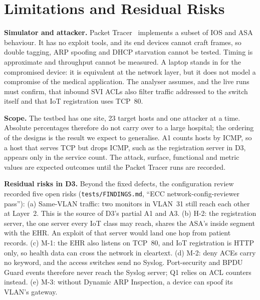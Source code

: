 \section{Limitations and Residual Risks}
\label{sec:limits}

\textbf{Simulator and attacker.} Packet Tracer~\cite{packettracer} implements a subset of IOS and ASA behaviour. It has no exploit tools, and its end devices cannot craft frames, so double tagging, ARP spoofing and DHCP starvation cannot be tested. Timing is approximate and throughput cannot be measured. A laptop stands in for the compromised device: it is equivalent at the network layer, but it does not model a compromise of the medical application. The analyser assumes, and the live runs must confirm, that inbound SVI ACLs also filter traffic addressed to the switch itself and that IoT registration uses TCP~80.

\textbf{Scope.} The testbed has one site, 23 target hosts and one attacker at a time. Absolute percentages therefore do not carry over to a large hospital; the ordering of the designs is the result we expect to generalise. A1 counts hosts by ICMP, so a host that serves TCP but drops ICMP, such as the registration server in D3, appears only in the service count. \ifmeasured\else The attack, surface, functional and metric values are expected outcomes until the Packet Tracer runs are recorded.\fi

\textbf{Residual risks in D3.} Beyond the fixed defects, the configuration review recorded five open risks (\texttt{tests/FINDINGS.md}, ``ECC network-config-reviewer pass''):
(a) Same-VLAN traffic: two monitors in VLAN~31 still reach each other at Layer~2. This is the source of D3's partial A1 and A3.
(b) H-2: the registration server, the one server every IoT class may reach, shares the ASA's inside segment with the EHR. An exploit of that server would land one hop from patient records.
(c) M-1: the EHR also listens on TCP~80, and IoT registration is HTTP only, so health data can cross the network in cleartext.
(d) M-2: deny ACEs carry no  keyword, and the access switches send no Syslog. Port-security and BPDU Guard events therefore never reach the Syslog server; Q1 relies on ACL counters instead.
(e) M-3: without Dynamic ARP Inspection, a device can spoof its VLAN's gateway.
